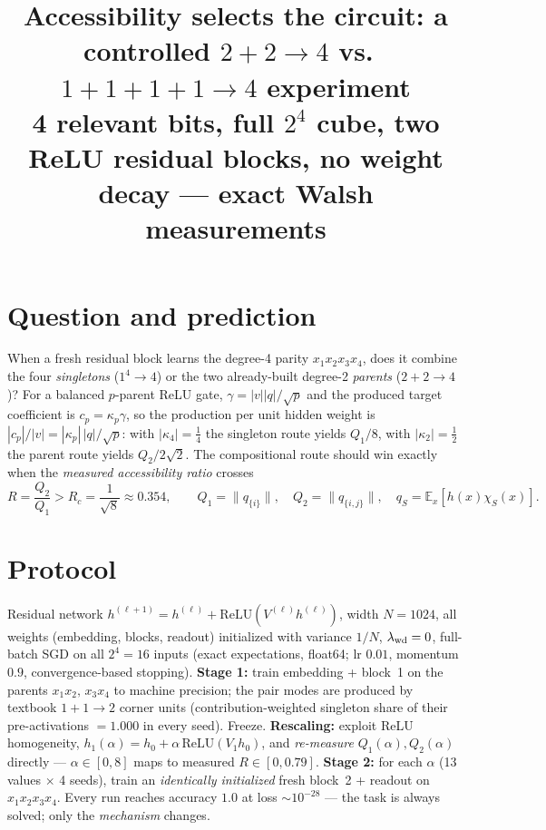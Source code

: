 \documentclass[10pt]{article}
\title{\vspace{-1.4cm}Accessibility selects the circuit: a controlled $2{+}2\!\to\!4$ vs.\
$1{+}1{+}1{+}1\!\to\!4$ experiment\\
\large 4 relevant bits, full $2^4$ cube, two ReLU residual blocks, no weight decay --- exact Walsh measurements}
\author{}\date{\vspace{-1.2cm}}
\begin{document}
\maketitle\vspace{-1.9cm}

\section*{Question and prediction}
When a fresh residual block learns the degree-4 parity $x_1x_2x_3x_4$, does it combine the four
\emph{singletons} ($1^4\!\to\!4$) or the two already-built degree-2 \emph{parents}
($2{+}2\!\to\!4$)? For a balanced $p$-parent ReLU gate, $\gamma=|v||q|/\sqrt p$ and the produced
target coefficient is $c_p=\kappa_p\gamma$, so the production per unit hidden weight is
$|c_p|/|v|=|\kappa_p|\,|q|/\sqrt p$: with $|\kappa_4|=\tfrac14$ the singleton route yields $Q_1/8$,
with $|\kappa_2|=\tfrac12$ the parent route yields $Q_2/2\sqrt2$. The compositional route should
win exactly when the \emph{measured accessibility ratio} crosses
\begin{equation*}
R=\frac{Q_2}{Q_1}>R_c=\frac{1}{\sqrt8}\approx0.354,\qquad
Q_1=\|q_{\{i\}}\|,\quad Q_2=\|q_{\{i,j\}}\|,\quad
q_S=\mathbb E_x\!\left[h(x)\chi_S(x)\right].
\end{equation*}

\section*{Protocol}
Residual network $h^{(\ell+1)}=h^{(\ell)}+\mathrm{ReLU}(V^{(\ell)}h^{(\ell)})$, width $N=1024$,
all weights (embedding, blocks, readout) initialized with variance $1/N$, $\lambda_{\rm wd}=0$,
full-batch SGD on all $2^4=16$ inputs (exact expectations, float64; lr $0.01$, momentum $0.9$,
convergence-based stopping). \textbf{Stage 1:} train embedding + block~1 on the parents
$x_1x_2,\,x_3x_4$ to machine precision; the pair modes are produced by textbook $1{+}1\!\to\!2$
corner units (contribution-weighted singleton share of their pre-activations $=1.000$ in every
seed). Freeze. \textbf{Rescaling:} exploit ReLU homogeneity,
$h_1(\alpha)=h_0+\alpha\,\mathrm{ReLU}(V_1h_0)$, and \emph{re-measure} $Q_1(\alpha),Q_2(\alpha)$
directly --- $\alpha\in[0,8]$ maps to measured $R\in[0,0.79]$. \textbf{Stage 2:} for each
$\alpha$ (13 values $\times$ 4 seeds), train an \emph{identically initialized} fresh block~2 +
readout on $x_1x_2x_3x_4$. Every run reaches accuracy $1.0$ at loss $\sim\!10^{-28}$ --- the
task is always solved; only the \emph{mechanism} changes.
\end{document}
